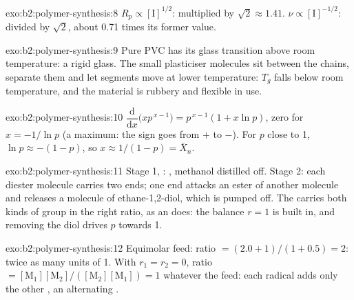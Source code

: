 \begin{solution}{exo:b2:polymer-synthesis:8}
$R_p \propto [\mathrm I]^{1/2}$: multiplied by $\sqrt2 \approx 1.41$. $\nu \propto [\mathrm I]^{-1/2}$:
divided by $\sqrt 2$, about 0.71 times its former value.
\end{solution}

\begin{solution}{exo:b2:polymer-synthesis:9}
Pure PVC has its glass transition above room temperature: a rigid glass. The small plasticiser
molecules sit between the chains, separate them and let segments move at lower temperature: $T_g$ falls
below room temperature, and the material is rubbery and flexible in use.
\end{solution}

\begin{solution}{exo:b2:polymer-synthesis:10}
$\dfrac{\mathrm d}{\mathrm dx}\bigl(x p^{\,x-1}\bigr) = p^{\,x-1}(1 + x\ln p)$, zero for $x = -1/\ln p$
(a maximum: the sign goes from $+$ to $-$). For $p$ close to 1, $\ln p \approx -(1-p)$, so $x \approx
1/(1-p) = \bar X_n$.
\end{solution}

\begin{solution}{exo:b2:polymer-synthesis:11}
Stage 1, : , methanol
distilled off. Stage 2: each diester molecule carries two  ends; one end attacks an ester
of another molecule and releases a molecule of ethane-1,2-diol, which is pumped off. The 
carries both kinds of group in the right ratio, as an   does: the balance $r = 1$ is
built in, and removing the diol drives $p$ towards 1.
\end{solution}

\begin{solution}{exo:b2:polymer-synthesis:12}
Equimolar feed: ratio $= (2.0 + 1)/(1 + 0.5) = 2$: twice as many units of  1. With $r_1 = r_2 =
0$, ratio $= [\mathrm M_1][\mathrm M_2]/([\mathrm M_2][\mathrm M_1]) = 1$ whatever the feed: each
radical adds only the other , an alternating .
\end{solution}

